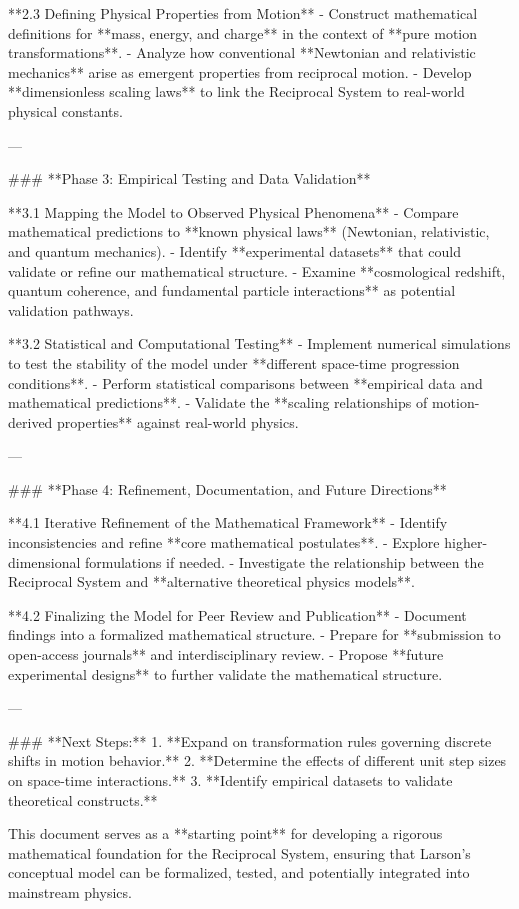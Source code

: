 **2.3 Defining Physical Properties from Motion**
- Construct mathematical definitions for **mass, energy, and charge** in the context of **pure motion transformations**.
- Analyze how conventional **Newtonian and relativistic mechanics** arise as emergent properties from reciprocal motion.
- Develop **dimensionless scaling laws** to link the Reciprocal System to real-world physical constants.

---

### **Phase 3: Empirical Testing and Data Validation**

**3.1 Mapping the Model to Observed Physical Phenomena**
- Compare mathematical predictions to **known physical laws** (Newtonian, relativistic, and quantum mechanics).
- Identify **experimental datasets** that could validate or refine our mathematical structure.
- Examine **cosmological redshift, quantum coherence, and fundamental particle interactions** as potential validation pathways.

**3.2 Statistical and Computational Testing**
- Implement numerical simulations to test the stability of the model under **different space-time progression conditions**.
- Perform statistical comparisons between **empirical data and mathematical predictions**.
- Validate the **scaling relationships of motion-derived properties** against real-world physics.

---

### **Phase 4: Refinement, Documentation, and Future Directions**

**4.1 Iterative Refinement of the Mathematical Framework**
- Identify inconsistencies and refine **core mathematical postulates**.
- Explore higher-dimensional formulations if needed.
- Investigate the relationship between the Reciprocal System and **alternative theoretical physics models**.

**4.2 Finalizing the Model for Peer Review and Publication**
- Document findings into a formalized mathematical structure.
- Prepare for **submission to open-access journals** and interdisciplinary review.
- Propose **future experimental designs** to further validate the mathematical structure.

---

### **Next Steps:**
1. **Expand on transformation rules governing discrete shifts in motion behavior.**
2. **Determine the effects of different unit step sizes on space-time interactions.**
3. **Identify empirical datasets to validate theoretical constructs.**

This document serves as a **starting point** for developing a rigorous mathematical foundation for the Reciprocal System, ensuring that Larson’s conceptual model can be formalized, tested, and potentially integrated into mainstream physics.

